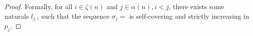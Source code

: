 \begin{proof}
  Formally, for all $i \in \zeta(n)$ and $j \in \alpha(n), i < j$, there exists some naturals $l_{j,i}$ such that the sequence
  $\sigma_j = $
  is self-covering and strictly increasing in $p_j$.
 
%
%
% 
%
%
%
%
%
%
%
%
%
%
%
%
%
%
%
%
%
%
%
%
%
%
%
%
%
%

\end{proof}
